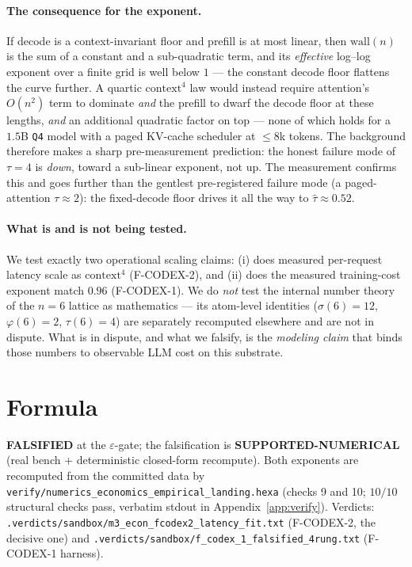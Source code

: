 \documentclass[11pt,a4paper]{article}
\newcommand{\green}[1]{\textcolor{green!50!black}{\textbf{#1}}}
\newcommand{\red}[1]{\textcolor{red!70!black}{\textbf{#1}}}
\newcommand{\ctx}{\ensuremath{n}}
\newcommand{\taum}{\ensuremath{\hat{\tau}}}
\begin{document}
\paragraph{The consequence for the exponent.}
If decode is a context-invariant floor and prefill is at most linear, then
\(\mathrm{wall}(\ctx)\) is the sum of a constant and a sub-quadratic term, and
its \emph{effective} log--log exponent over a finite grid is well below \(1\)
--- the constant decode floor flattens the curve further. A quartic
\(\mathrm{context}^4\) law would instead require attention's \(O(n^2)\) term to
dominate \emph{and} the prefill to dwarf the decode floor at these lengths,
\emph{and} an additional quadratic factor on top --- none of which holds for a
\(1.5\)B \texttt{Q4} model with a paged KV-cache scheduler at \(\le\!8\)k
tokens. The background therefore makes a sharp pre-measurement prediction: the
honest failure mode of \(\tau = 4\) is \emph{down}, toward a sub-linear
exponent, not up. The measurement confirms this and goes further than the
gentlest pre-registered failure mode (a paged-attention \(\tau \approx 2\)):
the fixed-decode floor drives it all the way to \(\taum \approx 0.52\).

\paragraph{What is and is not being tested.}
We test exactly two operational scaling claims: (i) does measured per-request
latency scale as \(\mathrm{context}^4\) (F-CODEX-2), and (ii) does the
measured training-cost exponent match \(0.96\) (F-CODEX-1). We do \emph{not}
test the internal number theory of the \(n{=}6\) lattice as mathematics --- its
atom-level identities (\(\sigma(6)=12\), \(\varphi(6)=2\), \(\tau(6)=4\)) are
separately recomputed elsewhere and are not in dispute. What is in dispute, and
what we falsify, is the \emph{modeling claim} that binds those numbers to
observable LLM cost on this substrate.

\section{Formula}
\label{sec:formula}
\red{FALSIFIED} at the \(\varepsilon\)-gate; the falsification is
\green{SUPPORTED-NUMERICAL} (real bench + deterministic closed-form recompute).
Both exponents are recomputed from the committed data by
\texttt{verify/numerics\_economics\_empirical\_landing.hexa} (checks 9 and 10;
\(10/10\) structural checks pass, verbatim stdout in
Appendix~\ref{app:verify}). Verdicts:
\texttt{.verdicts/sandbox/m3\_econ\_fcodex2\_latency\_fit.txt} (F-CODEX-2, the
decisive one) and \texttt{.verdicts/sandbox/f\_codex\_1\_falsified\_4rung.txt}
(F-CODEX-1 harness).
\end{document}
